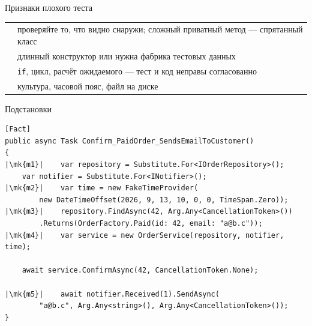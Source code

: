 \documentclass[aspectratio=169,10pt,t]{beamer}
\newcommand{\codexxs}{\ttfamily\fontsize{6.8}{7.8}\selectfont}
\newcommand{\mk}[1]{\tikz[remember picture,overlay]\coordinate (#1) at (0,0.55ex);}
\begin{document}
\begin{frame}[plain]
\end{frame}

\begin{frame}{Признаки плохого теста}
  \slidetop
  {\renewcommand{\arraystretch}{1.5}
  \begin{tabular}{@{}L{4.6cm}L{8.2cm}@{}}
     & проверяйте то, что видно снаружи;
      сложный приватный метод --- спрятанный класс \\
     & длинный конструктор или нужна
      фабрика тестовых данных \\
          & \texttt{if}, цикл, расчёт ожидаемого ---
      тест и код неправы согласованно \\
      & культура, часовой пояс, файл на диске \\
  \end{tabular}}

  \slidegap
\end{frame}

\begin{frame}[fragile]{Подстановки}
  \vspace{0.3em}
\begin{lstlisting}[style=csharp,basicstyle=\codexxs,escapechar=|]
[Fact]
public async Task Confirm_PaidOrder_SendsEmailToCustomer()
{
|\mk{m1}|    var repository = Substitute.For<IOrderRepository>();
    var notifier = Substitute.For<INotifier>();
|\mk{m2}|    var time = new FakeTimeProvider(
        new DateTimeOffset(2026, 9, 13, 10, 0, 0, TimeSpan.Zero));
|\mk{m3}|    repository.FindAsync(42, Arg.Any<CancellationToken>())
        .Returns(OrderFactory.Paid(id: 42, email: "a@b.c"));
|\mk{m4}|    var service = new OrderService(repository, notifier, time);

    await service.ConfirmAsync(42, CancellationToken.None);

|\mk{m5}|    await notifier.Received(1).SendAsync(
        "a@b.c", Arg.Any<string>(), Arg.Any<CancellationToken>());
}
\end{lstlisting}

  \slidegap
\end{frame}
\end{document}
